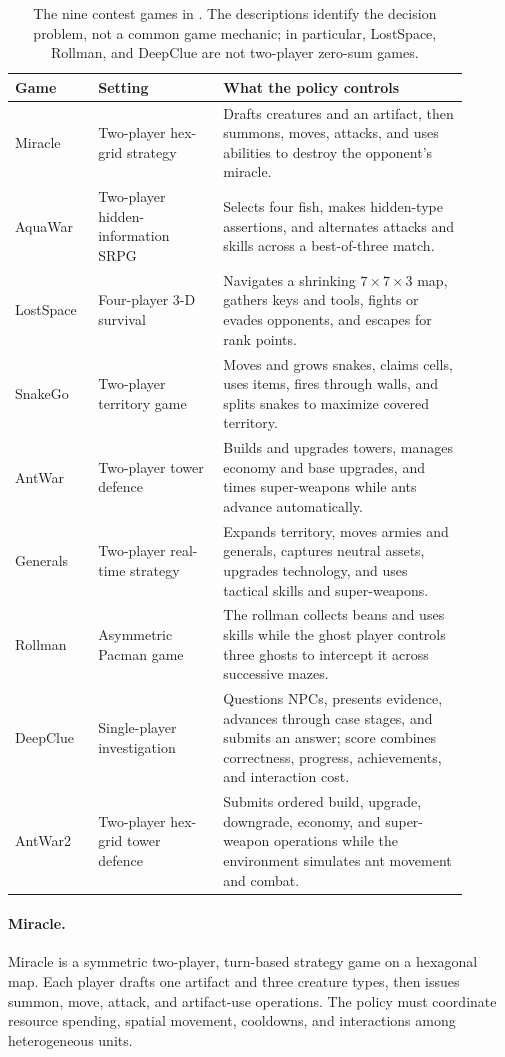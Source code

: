 \begin{table}[t]
\centering
\small
\begin{tabular}{p{0.16\linewidth}p{0.25\linewidth}p{0.49\linewidth}}
\toprule
Game & Setting & What the policy controls \\
\midrule
Miracle & Two-player hex-grid strategy & Drafts creatures and an artifact, then summons, moves, attacks, and uses abilities to destroy the opponent's miracle. \\
AquaWar & Two-player hidden-information SRPG & Selects four fish, makes hidden-type assertions, and alternates attacks and skills across a best-of-three match. \\
LostSpace & Four-player 3-D survival & Navigates a shrinking $7\times7\times3$ map, gathers keys and tools, fights or evades opponents, and escapes for rank points. \\
SnakeGo & Two-player territory game & Moves and grows snakes, claims cells, uses items, fires through walls, and splits snakes to maximize covered territory. \\
AntWar & Two-player tower defence & Builds and upgrades towers, manages economy and base upgrades, and times super-weapons while ants advance automatically. \\
Generals & Two-player real-time strategy & Expands territory, moves armies and generals, captures neutral assets, upgrades technology, and uses tactical skills and super-weapons. \\
Rollman & Asymmetric Pacman game & The rollman collects beans and uses skills while the ghost player controls three ghosts to intercept it across successive mazes. \\
DeepClue & Single-player investigation & Questions NPCs, presents evidence, advances through case stages, and submits an answer; score combines correctness, progress, achievements, and interaction cost. \\
AntWar2 & Two-player hex-grid tower defence & Submits ordered build, upgrade, downgrade, economy, and super-weapon operations while the environment simulates ant movement and combat. \\
\bottomrule
\end{tabular}
\caption{The nine contest games in \benchname. The descriptions identify the decision
problem, not a common game mechanic; in particular, LostSpace, Rollman, and DeepClue are
not two-player zero-sum games.}
\label{tab:game-descriptions}
\end{table}

\paragraph{Miracle.} Miracle is a symmetric two-player, turn-based strategy game on a
hexagonal map. Each player drafts one artifact and three creature types, then issues
summon, move, attack, and artifact-use operations. The policy must coordinate resource
spending, spatial movement, cooldowns, and interactions among heterogeneous units.

